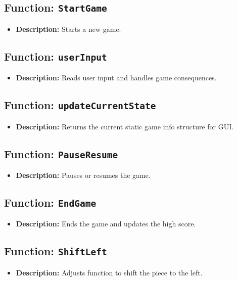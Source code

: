 \documentclass{article}
\begin{document}
\subsection{Function: \texttt{StartGame}}
\begin{itemize}
    \item \textbf{Description:} Starts a new game.
\end{itemize}

\subsection{Function: \texttt{userInput}}
\begin{itemize}
    \item \textbf{Description:} Reads user input and handles game consequences.
\end{itemize}

\subsection{Function: \texttt{updateCurrentState}}
\begin{itemize}
    \item \textbf{Description:} Returns the current static game info structure for GUI.
\end{itemize}

\subsection{Function: \texttt{PauseResume}}
\begin{itemize}
    \item \textbf{Description:} Pauses or resumes the game.
\end{itemize}

\subsection{Function: \texttt{EndGame}}
\begin{itemize}
    \item \textbf{Description:} Ends the game and updates the high score.
\end{itemize}

\subsection{Function: \texttt{ShiftLeft}}
\begin{itemize}
    \item \textbf{Description:} Adjusts function to shift the piece to the left.
\end{itemize}
\end{document}
